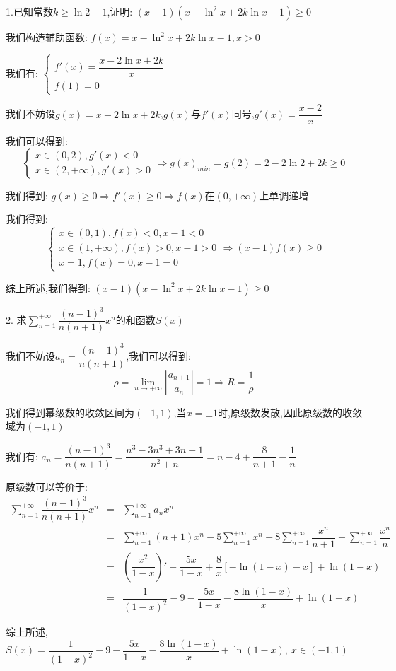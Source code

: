 1.已知常数$k\geq \ln2-1$,证明:  $(x-1)(x-\ln^2 x+2k\ln x-1)\geq 0$
\begin{solution}

	我们构造辅助函数:  $f(x)=x-\ln^2 x+2k\ln x-1,x>0$
	
	我们有:  $\left\lbrace
	\begin{array}{l}
		f'(x)=\dfrac{x-2\ln x+2k}{x}\\
		f(1)=0
	\end{array}
	\right. $
	
	我们不妨设$g(x)=x-2\ln x+2k$,$g(x)$与$f'(x)$同号,$g'(x)=\dfrac{x-2}{x}$
	
	我们可以得到:  $$\left\lbrace
	\begin{array}{l}
		x\in(0,2),g'(x)<0\\
		x\in(2,+\infty),g'(x)>0
	\end{array}
	\right. \Rightarrow g(x)_{min}=g(2)=2-2\ln2+2k\geq 0$$
	
	我们得到:  $g(x)\geq 0\Rightarrow f'(x)\geq 0\Rightarrow f(x)\text{在}(0,+\infty)\text{上单调递增}$
	
	我们得到:  
	$$\left\lbrace
	\begin{array}{l}
		x\in(0,1),f(x)<0,x-1<0\\
		x\in(1,+\infty),f(x)>0,x-1>0\\
		x=1,f(x)=0,x-1=0
	\end{array}
	\right. \Rightarrow (x-1)f(x)\geq 0$$
	
	综上所述,我们得到:  $(x-1)(x-\ln^2 x+2k\ln x-1)\geq 0$
\end{solution}

2. 求$\sum\limits_{n=1}^{+\infty}\dfrac{(n-1)^3}{n(n+1)}x^n$的和函数$S(x)$
\begin{solution}

	我们不妨设$a_{n}=\dfrac{(n-1)^3}{n(n+1)}$,我们可以得到:  
	$$\rho=\lim\limits_{n\rightarrow+\infty}|\dfrac{a_{n+1}}{a_{n}}|=1\Rightarrow R=\dfrac{1}{\rho}$$
	
	我们得到幂级数的收敛区间为$(-1,1)$,当$x=\pm 1$时,原级数发散,因此原级数的收敛域为$(-1,1)$
	
	我们有:  $a_{n}=\dfrac{(n-1)^3}{n(n+1)}=\dfrac{n^3-3n^3+3n-1}{n^2+n}=n-4+\dfrac{8}{n+1}-\dfrac{1}{n}$
	
	原级数可以等价于:  
	\begin{eqnarray*}
		\sum\limits_{n=1}^{+\infty}\dfrac{(n-1)^3}{n(n+1)}x^n&=&\sum\limits_{n=1}^{+\infty}a_{n}x^n\\
		&=&\sum\limits_{n=1}^{+\infty}(n+1)x^n-5\sum\limits_{n=1}^{+\infty}x^n+8\sum\limits_{n=1}^{+\infty}\dfrac{x^n}{n+1}-\sum\limits_{n=1}^{+\infty}\dfrac{x^n}{n}\\
		&=&(\dfrac{x^2}{1-x})'-\dfrac{5x}{1-x}+\dfrac{8}{x}[-\ln(1-x)-x]+\ln(1-x)\\
		&=&\dfrac{1}{(1-x)^2}-9-\dfrac{5x}{1-x}-\dfrac{8\ln(1-x)}{x}+\ln(1-x)
	\end{eqnarray*}

综上所述,$S(x)=\dfrac{1}{(1-x)^2}-9-\dfrac{5x}{1-x}-\dfrac{8\ln(1-x)}{x}+\ln(1-x), \ x\in(-1,1)$
\end{solution}

